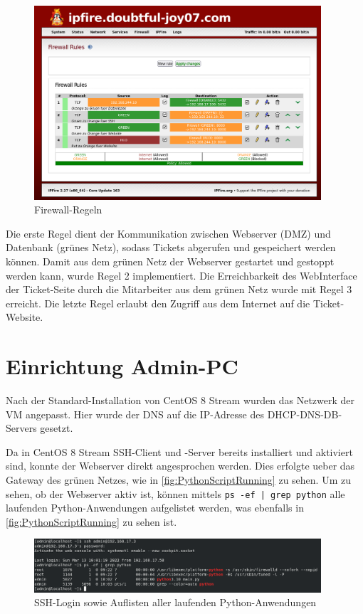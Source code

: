 \documentclass[a4paper,
    11pt,
    headings=small,
    ngerman,
    listof=totoc,
    numbers=noenddot]{scrreprt}[2021/11/13]
\begin{document}
\begin{figure}[htbp]
  \centering
  \includegraphics[width=0.95\textwidth]{data/ipfire-config.png}
  \caption{Firewall-Regeln}
  \label{fig:FirewallConfig}
\end{figure}

Die erste Regel dient der Kommunikation zwischen Webserver (\ac{DMZ}) und Datenbank (grünes Netz), sodass Tickets abgerufen und gespeichert werden können. Damit aus dem grünen Netz der Webserver gestartet und gestoppt werden kann, wurde Regel 2 implementiert. Die Erreichbarkeit des WebInterface der Ticket-Seite durch die Mitarbeiter aus dem grünen Netz wurde mit Regel 3 erreicht. Die letzte Regel erlaubt den Zugriff aus dem Internet auf die Ticket-Website.


\section{Einrichtung Admin-PC}

Nach der Standard-Installation von CentOS 8 Stream wurden das Netzwerk der \ac{VM} angepasst. Hier wurde der \ac{DNS} auf die IP-Adresse des \ac{DHCP}-\ac{DNS}-\ac{DB}-Servers gesetzt.

Da in CentOS 8 Stream SSH-Client und -Server bereits installiert und aktiviert sind, konnte der Webserver direkt angesprochen werden. Dies erfolgte ueber das Gateway des grünen Netzes, wie in \vref{fig:PythonScriptRunning} zu sehen. Um zu sehen, ob der Webserver aktiv ist, können mittels \texttt{ps -ef | grep python} alle laufenden Python-Anwendungen aufgelistet werden, was ebenfalls in \vref{fig:PythonScriptRunning} zu sehen ist.

\begin{figure}[htbp]
  \centering
  \includegraphics[width=0.95\textwidth]{data/py-script-running.png}
  \caption{SSH-Login sowie Auflisten aller laufenden Python-Anwendungen}
  \label{fig:PythonScriptRunning}
\end{figure}
\end{document}
